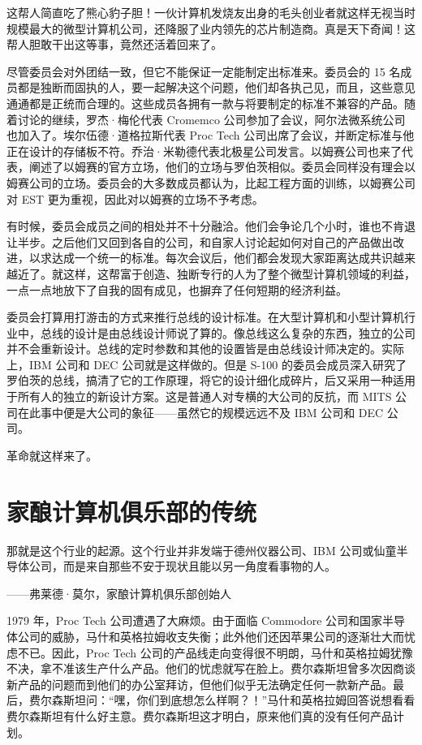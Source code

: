 \documentclass[12pt,UTF8]{ctexbook}
\begin{document}
这帮人简直吃了熊心豹子胆！一伙计算机发烧友出身的毛头创业者就这样无视当时规模最大的微型计算机公司，还降服了业内领先的芯片制造商。真是天下奇闻！这帮人胆敢干出这等事，竟然还活着回来了。

尽管委员会对外团结一致，但它不能保证一定能制定出标准来。委员会的 15 名成员都是独断而固执的人，要一起解决这个问题，他们却各执己见，而且，这些意见通通都是正统而合理的。这些成员各拥有一款与将要制定的标准不兼容的产品。随着讨论的继续，罗杰·梅伦代表 Cromemco 公司参加了会议，阿尔法微系统公司也加入了。埃尔伍德·道格拉斯代表 Proc Tech 公司出席了会议，并断定标准与他正在设计的存储板不符。乔治·米勒德代表北极星公司发言。以姆赛公司也来了代表，阐述了以姆赛的官方立场，他们的立场与罗伯茨相似。委员会同样没有理会以姆赛公司的立场。委员会的大多数成员都认为，比起工程方面的训练，以姆赛公司对 EST 更为重视，因此对以姆赛的立场不予考虑。

有时候，委员会成员之间的相处并不十分融洽。他们会争论几个小时，谁也不肯退让半步。之后他们又回到各自的公司，和自家人讨论起如何对自己的产品做出改进，以求达成一个统一的标准。每次会议后，他们都会发现大家距离达成共识越来越近了。就这样，这帮富于创造、独断专行的人为了整个微型计算机领域的利益，一点一点地放下了自我的固有成见，也摒弃了任何短期的经济利益。

委员会打算用打游击的方式来推行总线的设计标准。在大型计算机和小型计算机行业中，总线的设计是由总线设计师说了算的。像总线这么复杂的东西，独立的公司并不会重新设计。总线的定时参数和其他的设置皆是由总线设计师决定的。实际上，IBM 公司和 DEC 公司就是这样做的。但是 S-100 的委员会成员深入研究了罗伯茨的总线，搞清了它的工作原理，将它的设计细化成碎片，后又采用一种适用于所有人的独立的新设计方案。这是普通人对专横的大公司的反抗，而 MITS 公司在此事中便是大公司的象征——虽然它的规模远远不及 IBM 公司和 DEC 公司。

革命就这样来了。





\section{家酿计算机俱乐部的传统}


那就是这个行业的起源。这个行业并非发端于德州仪器公司、IBM 公司或仙童半导体公司，而是来自那些不安于现状且能以另一角度看事物的人。

——弗莱德·莫尔，家酿计算机俱乐部创始人



1979 年，Proc Tech 公司遭遇了大麻烦。由于面临 Commodore 公司和国家半导体公司的威胁，马什和英格拉姆收支失衡；此外他们还因苹果公司的逐渐壮大而忧虑不已。因此，Proc Tech 公司的产品线走向变得很不明朗，马什和英格拉姆犹豫不决，拿不准该生产什么产品。他们的忧虑就写在脸上。费尔森斯坦曾多次因商谈新产品的问题而到他们的办公室拜访，但他们似乎无法确定任何一款新产品。最后，费尔森斯坦问：“嘿，你们到底想怎么样啊？！”马什和英格拉姆回答说想看看费尔森斯坦有什么好主意。费尔森斯坦这才明白，原来他们真的没有任何产品计划。
\end{document}
